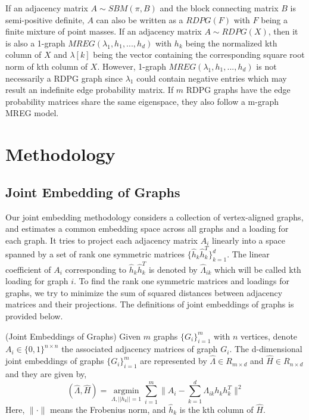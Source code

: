 \documentclass[10pt,journal,compsoc]{IEEEtran}
\newenvironment{definition}[1][Definition]{\begin{trivlist}
		\item[\hskip \labelsep {\bfseries #1}]}{\end{trivlist}}
\begin{document}
\noindent If an adjacency matrix $A \sim SBM(\pi,B)$ and the block connecting matrix $B$ is semi-positive definite, $A$ can also be written as a $RDPG(F)$ with $F$ being a finite mixture of point masses. If an adjacency matrix $A \sim RDPG(X)$, then it is also a 1-graph $MREG(\lambda_1,h_1,...,h_d)$ with $h_k$ being the normalized kth column of $X$ and $\lambda[k]$ being the vector containing the corresponding square root norm of kth column of $X$. However, 1-graph $MREG(\lambda_1,h_1,...,h_d)$ is not necessarily a RDPG graph since $\lambda_1$ could contain negative entries which may result an indefinite edge probability matrix. If $m$ RDPG graphs have the edge probability matrices share the same eigenspace, they also follow a m-graph MREG model.

\section{Methodology}
\subsection{Joint Embedding of Graphs}
Our joint embedding methodology considers a collection of vertex-aligned graphs, and estimates a common embedding space across all graphs and a loading for each graph. It tries to project each adjacency matrix $A_i$ linearly into a space spanned by a set of rank one symmetric matrices $\{\hat{h}_k \hat{h}_k^T\}_{k=1}^{d}$. The linear coefficient of $A_i$ corresponding to $\hat{h}_k \hat{h}_k^T$ is denoted by $\hat{\Lambda}_{ik}$ which will be called kth loading for graph $i$. To find the rank one symmetric matrices and loadings for graphs, we try to minimize the sum of squared distances between adjacency matrices and their projections. The definitions of joint embeddings of graphs is provided below.

\begin{definition} (Joint Embeddings of Graphs) Given $m$  graphs $\{G_i \} _{i=1}^{m}$ with $n$ vertices, denote $A_i \in \{0,1\}^{n \times n }$ the associated adjacency matrices of graph $G_i$. The d-dimensional joint embeddings of graphs $\{G_i \} _{i=1}^{m}$ are represented by $\hat{\Lambda} \in R_{m \times d}$ and $\hat{H} \in R _{n \times d}$ and they are given by,
\[ (\hat{\Lambda},\hat{H}) = \underset{\Lambda,||h_k||=1}{\operatorname{argmin}} \sum\limits_{i=1}^{m} \| A_i- \sum\limits_{k=1}^{d} \Lambda_{ik} h_k h_k^T \|  ^2  \] 
Here, $\| \cdot \|$ means the Frobenius norm, and $\hat{h}_k$ is the kth column of $\hat{H}$. 
\end{definition}
\end{document}

